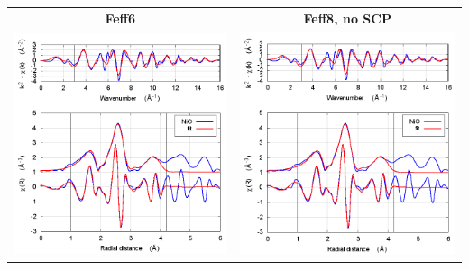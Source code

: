 \documentclass[11pt]{article}
\begin{document}
\begin{center}
  \begin{tabular}{cc}
    \textbf{Feff6} & \textbf{Feff8, no SCP} \\
    \includegraphics[width=.45\linewidth]{NiO/scf/fit_feff6.png} & 
    \includegraphics[width=.45\linewidth]{NiO/scf/fit_noSCF.png} \\
  \end{tabular}
\end{center}
\end{document}
